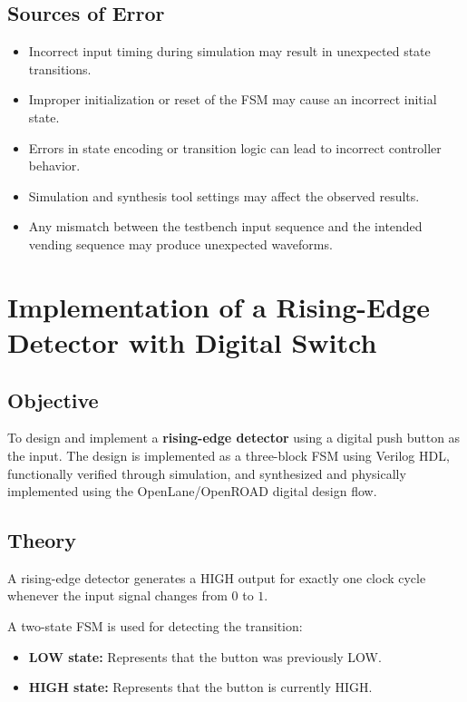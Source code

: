 \documentclass[12pt,a4paper]{report}
\begin{document}
\section{Sources of Error}

\begin{itemize}
    \item Incorrect input timing during simulation may result in unexpected state transitions.
    \item Improper initialization or reset of the FSM may cause an incorrect initial state.
    \item Errors in state encoding or transition logic can lead to incorrect controller behavior.
    \item Simulation and synthesis tool settings may affect the observed results.
    \item Any mismatch between the testbench input sequence and the intended vending sequence may produce unexpected waveforms.
\end{itemize}

\vspace{2.5cm}

\chapter{Implementation of a Rising-Edge Detector with Digital Switch}
\label{ch:pdf23}

\section{Objective}

To design and implement a \textbf{rising-edge detector} using a digital push button as the input. The design is implemented as a three-block FSM using Verilog HDL, functionally verified through simulation, and synthesized and physically implemented using the OpenLane/OpenROAD digital design flow.

\section{Theory}

A rising-edge detector generates a HIGH output for exactly one clock cycle whenever the input signal changes from $0$ to $1$.

A two-state FSM is used for detecting the transition:

\begin{itemize}
    \item \textbf{LOW state:} Represents that the button was previously LOW.
    \item \textbf{HIGH state:} Represents that the button is currently HIGH.
\end{itemize}
\end{document}
